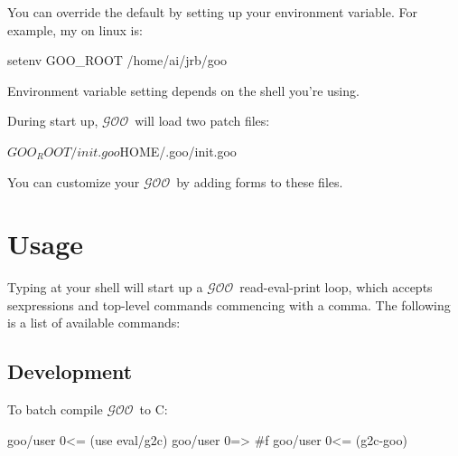 \documentclass[twoside,twocolumn,9pt]{extarticle}
\newcommand{\goo}{$\mathcal{GOO}$}
\begin{document}
You can override the default  by
setting up your  environment variable.  
For example, my  on linux is: 

\begin{exv}
setenv GOO_ROOT /home/ai/jrb/goo
\end{exv}

Environment variable setting depends on the shell you're using.

During start up, \goo\ will load two patch files:

\begin{exv}
${GOO_ROOT}/init.goo
${HOME}/.goo/init.goo
\end{exv}

You can customize your \goo\ by adding forms to these files.

\section{Usage}

Typing  at your shell will start up a \goo\ read-eval-print
loop, which accepts sexpressions and top-level commands commencing
with a comma.  The following is a list of available commands:

\begin{defs}
  \doc{exits from \goo.}
\end{defs}

\subsection{Development}

To batch compile \goo\ to C:

\begin{exv}
goo/user 0<= (use eval/g2c)
goo/user 0=> #f
goo/user 0<= (g2c-goo)
\end{exv}
\end{document}
